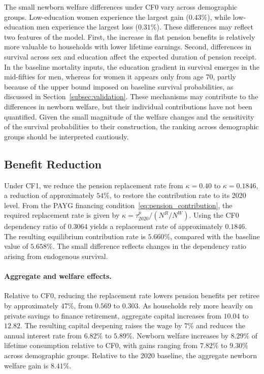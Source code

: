 \documentclass[12pt,a4paper]{article}
\begin{document}
The small newborn welfare differences under CF0 vary across demographic groups. Low-education women experience the largest gain ($0.43\%$), while low-education men experience the largest loss ($0.31\%$). These differences may reflect two features of the model. First, the increase in flat pension benefits is relatively more valuable to households with lower lifetime earnings. Second, differences in survival across sex and education affect the expected duration of pension receipt. In the baseline mortality inputs, the education gradient in survival emerges in the mid-fifties for men, whereas for women it appears only from age 70, partly because of the upper bound imposed on baseline survival probabilities, as discussed in Section~\ref{subsec:validation}. These mechanisms may contribute to the differences in newborn welfare, but their individual contributions have not been quantified. Given the small magnitude of the welfare changes and the sensitivity of the survival probabilities to their construction, the ranking across demographic groups should be interpreted cautiously.

\subsection{Benefit Reduction}
\label{subsec:exp_kappa_taum}

Under CF1, we reduce the pension replacement rate from $\kappa=0.40$ to $\kappa=0.1846$, a reduction of approximately $54\%$, to restore the contribution rate to its 2020 level. From the PAYG financing condition~\eqref{eq:pension_contribution}, the required replacement rate is given by $\kappa=\tau^p_{2020}/(N^R/N^W)$. Using the CF0 dependency ratio of $0.3064$ yields a replacement rate of approximately $0.1846$. The resulting equilibrium contribution rate is $5.660\%$, compared with the baseline value of $5.658\%$. The small difference reflects changes in the dependency ratio arising from endogenous survival.

\paragraph{Aggregate and welfare effects.}
Relative to CF0, reducing the replacement rate lowers pension benefits per retiree by approximately $47\%$, from $0.569$ to $0.303$. As households rely more heavily on private savings to finance retirement, aggregate capital increases from $10.04$ to $12.82$. The resulting capital deepening raises the wage by $7\%$ and reduces the annual interest rate from $6.82\%$ to $5.89\%$. Newborn welfare increases by $8.29\%$ of lifetime consumption relative to CF0, with gains ranging from $7.82\%$ to $9.30\%$ across demographic groups. Relative to the 2020 baseline, the aggregate newborn welfare gain is $8.41\%$.
\end{document}
